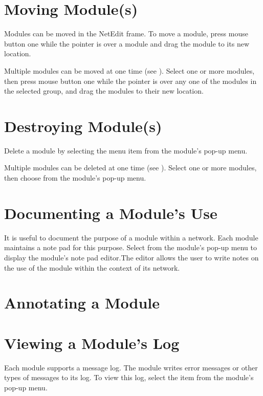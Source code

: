 \section{Moving Module(s)}
\label{sec:movemod}

Modules can be moved in the NetEdit frame.  To move a module,
press mouse button one while the pointer is over a module and drag the
module to its new location.

Multiple modules can be moved at one time
(see ).
Select one or more modules, then press mouse button one while the pointer is
over any one of the modules in the selected group,
and drag the modules to their new location.

\section{Destroying Module(s)}
\label{sec:destroymod}

Delete a module by selecting the  menu item from the
module's pop-up menu.

Multiple modules can be deleted at one time (see ).  Select one or more modules, then choose
 from the module's pop-up menu.

\section{Documenting a Module's Use}
\label{sec:docmodule}

It is useful to document the purpose of a module within a network.
Each module maintains a note pad for this purpose. Select
 from the module's pop-up menu to display the module's
note pad editor.The editor allows the user to write notes on the use
of the module within the context of its network.


\section{Annotating a Module}
\label{sec:annomodule}



\section{Viewing a Module's Log}
\label{sec:viewmodslog}

Each module supports a message log.  The module writes error messages
or other types of messages to its log.  To view this log, select the
 item from the module's pop-up menu.


